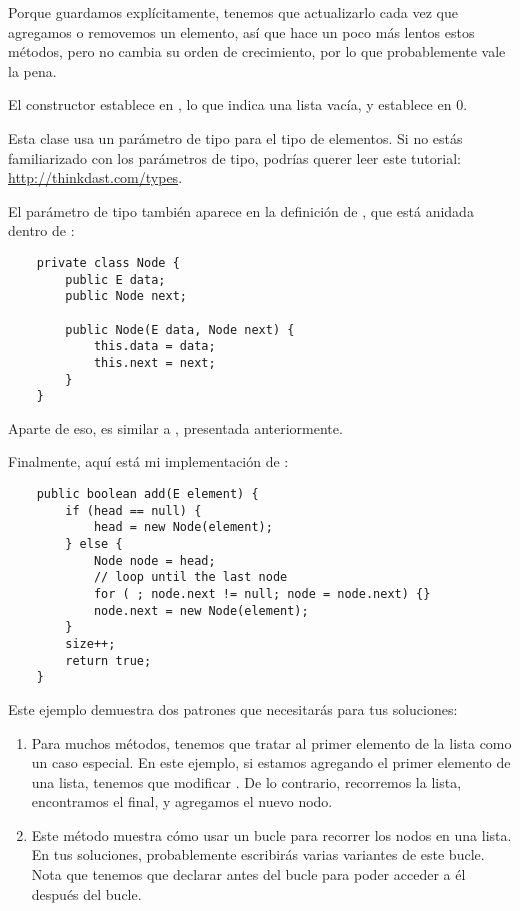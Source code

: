 \documentclass[12pt]{book}
\theoremstyle{exercise}
\begin{document}

Porque guardamos  explícitamente, tenemos que actualizarlo cada
vez que agregamos o removemos un elemento, así que hace un poco más lentos
estos métodos, pero no cambia su orden de crecimiento, por lo que probablemente
vale la pena.

El constructor establece  en , lo que indica una lista
vacía, y establece  en 0.


Esta clase usa un parámetro de tipo  para el tipo de
elementos. Si no estás familiarizado con los parámetros de tipo, podrías
querer leer este tutorial:
\url{http://thinkdast.com/types}.

El parámetro de tipo también aparece en la definición de ,
que está anidada dentro de :

\begin{verbatim}
    private class Node {
        public E data;
        public Node next;

        public Node(E data, Node next) {
            this.data = data;
            this.next = next;
        }
    }
\end{verbatim}

Aparte de eso,  es similar a , presentada anteriormente.


Finalmente, aquí está mi implementación de :

\begin{verbatim}
    public boolean add(E element) {
        if (head == null) {
            head = new Node(element);
        } else {
            Node node = head;
            // loop until the last node
            for ( ; node.next != null; node = node.next) {}
            node.next = new Node(element);
        }
        size++;
        return true;
    }
\end{verbatim}


Este ejemplo demuestra dos patrones que necesitarás para tus soluciones:

\begin{enumerate}

\item
  Para muchos métodos, tenemos que tratar al primer elemento de la lista como un
  caso especial. En este ejemplo, si estamos agregando el primer elemento de una
  lista, tenemos que modificar . De lo contrario, recorremos la
  lista, encontramos el final, y agregamos el nuevo nodo.

\item
  Este método muestra cómo usar un bucle  para recorrer los nodos
  en una lista. En tus soluciones, probablemente escribirás varias
  variantes de este bucle. Nota que tenemos que declarar 
  antes del bucle para poder acceder a él después del bucle.

\end{enumerate}
\end{document}
